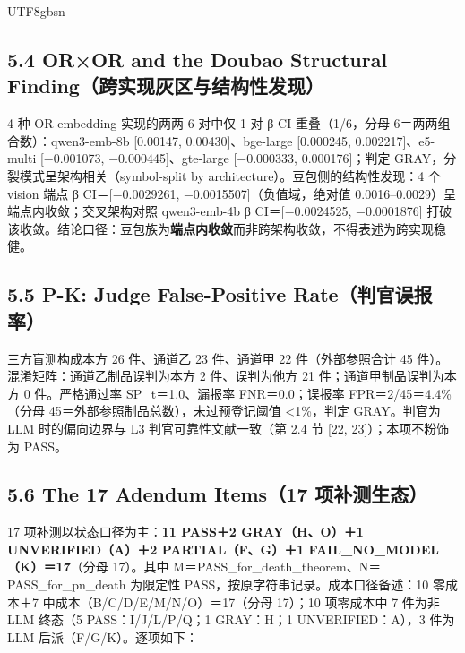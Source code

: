 \documentclass[10pt,a4paper]{article}
\begin{document}
\begin{CJK}{UTF8}{gbsn}
\subsection*{5.4 OR×OR and the Doubao Structural Finding（跨实现灰区与结构性发现）}4 种 OR embedding 实现的两两 6 对中仅 1 对 β CI 重叠（1/6，分母 6＝两两组合数）：qwen3-emb-8b [0.00147, 0.00430]、bge-large [0.000245, 0.002217]、e5-multi [−0.001073, −0.000445]、gte-large [−0.000333, 0.000176]；判定 GRAY，分裂模式呈架构相关（symbol-split by architecture）。豆包侧的结构性发现：4 个 vision 端点 β CI＝[−0.0029261, −0.0015507]（负值域，绝对值 0.0016–0.0029）呈端点内收敛；交叉架构对照 qwen3-emb-4b β CI＝[−0.0024525, −0.0001876] 打破该收敛。结论口径：豆包族为\textbf{端点内收敛}而非跨架构收敛，不得表述为跨实现稳健。

\subsection*{5.5 P-K: Judge False-Positive Rate（判官误报率）}三方盲测构成本方 26 件、通道乙 23 件、通道甲 22 件（外部参照合计 45 件）。混淆矩阵：通道乙制品误判为本方 2 件、误判为他方 21 件；通道甲制品误判为本方 0 件。严格通过率 SP\_t＝1.0、漏报率 FNR＝0.0；误报率 FPR＝2/45＝4.4\%（分母 45＝外部参照制品总数），未过预登记阈值 <1\%，判定 GRAY。判官为 LLM 时的偏向边界与 L3 判官可靠性文献一致（第 2.4 节 [22, 23]）；本项不粉饰为 PASS。

\subsection*{5.6 The 17 Adendum Items（17 项补测生态）}17 项补测以状态口径为主：\textbf{11 PASS＋2 GRAY（H、O）＋1 UNVERIFIED（A）＋2 PARTIAL（F、G）＋1 FAIL\_NO\_MODEL（K）＝17}（分母 17）。其中 M＝PASS\_for\_death\_theorem、N＝PASS\_for\_pn\_death 为限定性 PASS，按原字符串记录。成本口径备述：10 零成本＋7 中成本（B/C/D/E/M/N/O）＝17（分母 17）；10 项零成本中 7 件为非 LLM 终态（5 PASS：I/J/L/P/Q；1 GRAY：H；1 UNVERIFIED：A），3 件为 LLM 后派（F/G/K）。逐项如下：



\end{CJK}
\end{document}
